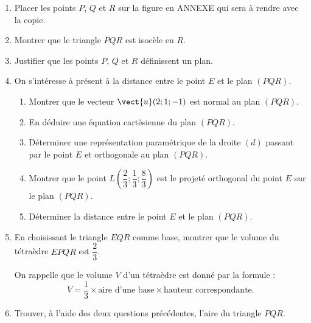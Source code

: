 \begin{enumerate}
	\item Placer les points $P$, $Q$ et $R$ sur la figure en \textsf{ANNEXE} qui sera à rendre avec la copie.
	\item Montrer que le triangle $PQR$ est isocèle en $R$.
	\item Justifier que les points $P$, $Q$ et $R$ définissent un plan.
	\item On s'intéresse à présent à la distance entre le point $E$ et le plan $(PQR)$.
	\begin{enumerate}
		\item Montrer que le vecteur $\vect{u}(2;1;- 1)$ est normal au plan $(PQR)$.
		\item En déduire une équation cartésienne du plan $(PQR)$.
		\item Déterminer une représentation paramétrique de la droite $(d)$ passant par le point $E$ et orthogonale au plan $(PQR)$.
		\item Montrer que le point $L\left(\dfrac23;\dfrac13;\dfrac83\right)$ est le projeté orthogonal du point $E$ sur le plan $(PQR)$.
		\item Déterminer la distance entre le point $E$ et le plan $(PQR)$.
	\end{enumerate}
	\item En choisissant le triangle $EQR$ comme base, montrer que le volume du tétraèdre $EPQR$ est $\dfrac23$.
	
	On rappelle que le volume $V$ d'un tétraèdre est donné par la formule : \[V = \dfrac13 \times \text{aire d'une base} \times \text{hauteur correspondante}.\]
	\item Trouver, à l'aide des deux questions précédentes, l'aire du triangle $PQR$.
\end{enumerate}


